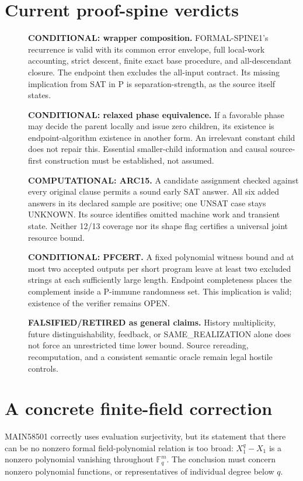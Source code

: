 \documentclass[11pt]{article}
\begin{document}
\section*{Current proof-spine verdicts}
\begin{description}
\item[] \textbf{CONDITIONAL: wrapper composition.} FORMAL-SPINE1's recurrence
is valid with its common error envelope, full local-work accounting,
strict descent, finite exact base procedure, and all-descendant closure.
The endpoint then excludes the all-input contract. Its missing implication
from SAT in P is separation-strength, as the source itself states.
\item[] \textbf{CONDITIONAL: relaxed phase equivalence.} If a favorable phase
may decide the parent locally and issue zero children, its existence is
endpoint-algorithm existence in another form. An irrelevant constant child
does not repair this. Essential smaller-child information and causal
source-first construction must be established, not assumed.
\item[] \textbf{COMPUTATIONAL: ARC15.} A candidate assignment checked against
every original clause permits a sound early SAT answer. All six added
answers in its declared sample are positive; one UNSAT case stays UNKNOWN.
Its source identifies omitted machine work and transient state. Neither
12/13 coverage nor its shape flag certifies a universal joint resource bound.
\item[] \textbf{CONDITIONAL: PFCERT.} A fixed polynomial witness bound and
at most two accepted outputs per short program leave at least two excluded
strings at each sufficiently large length. Endpoint completeness places
the complement inside a P-immune randomness set. This implication is valid;
existence of the verifier remains OPEN.
\item[] \textbf{FALSIFIED/RETIRED as general claims.} History multiplicity,
future distinguishability, feedback, or SAME\_REALIZATION alone does not
force an unrestricted time lower bound. Source rereading, recomputation,
and a consistent semantic oracle remain legal hostile controls.
\end{description}

\section*{A concrete finite-field correction}
MAIN58501 correctly uses evaluation surjectivity, but its statement that
there can be no nonzero formal field-polynomial relation is too broad:
$X_1^q-X_1$ is a nonzero polynomial vanishing throughout $\mathbb F_q^m$.
The conclusion must concern nonzero polynomial functions, or representatives
of individual degree below $q$.
\end{document}
